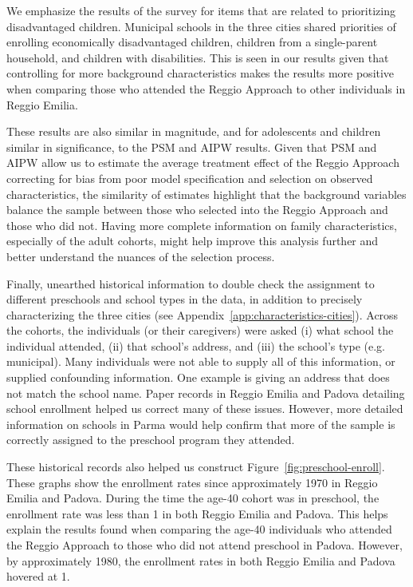 We emphasize the results of the survey for items that are related to prioritizing disadvantaged children. Municipal schools in the three cities shared priorities of enrolling economically disadvantaged children, children from a single-parent household, and children with disabilities. This is seen in our results given that controlling for more background characteristics makes the results more positive when comparing those who attended the Reggio Approach to other individuals in Reggio Emilia. 

These results are also similar in magnitude, and for adolescents and children similar in significance, to the PSM and AIPW results. Given that PSM and AIPW allow us to estimate the average treatment effect of the Reggio Approach correcting for bias from poor model specification and selection on observed characteristics, the similarity of estimates highlight that the background variables balance the sample between those who selected into the Reggio Approach and those who did not. Having more complete information on family characteristics, especially of the adult cohorts, might help improve this analysis further and better understand the nuances of the selection process. 

Finally, unearthed historical information to double check the assignment to different preschools and school types in the data, in addition to precisely characterizing the three cities (see Appendix~\ref{app:characteristics-cities}). Across the cohorts, the individuals (or their caregivers) were asked (i) what school the individual attended, (ii) that school's address, and (iii) the school's type (e.g. municipal). Many individuals were not able to supply all of this information, or supplied confounding information. One example is giving an address that does not match the school name. Paper records in Reggio Emilia and Padova detailing school enrollment helped us correct many of these issues. However, more detailed information on schools in Parma would help confirm that more of the sample is correctly assigned to the preschool program they attended.

These historical records also helped us construct Figure~\ref{fig:preschool-enroll}. These graphs show the enrollment rates since approximately 1970 in Reggio Emilia and Padova. During the time the age-40 cohort was in preschool, the enrollment rate was less than 1 in both Reggio Emilia and Padova. This helps explain the results found when comparing the age-40 individuals who attended the Reggio Approach to those who did not attend preschool in Padova. However, by approximately 1980, the enrollment rates in both Reggio Emilia and Padova hovered at 1. 

